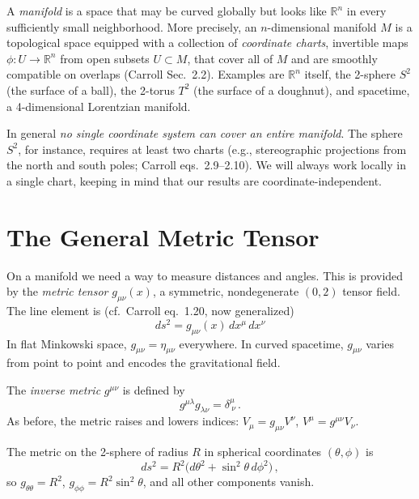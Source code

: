 A \emph{manifold} is a space that may be curved globally but looks
like $\mathbb{R}^n$ in every sufficiently small neighborhood.  More
precisely, an $n$-dimensional manifold $M$ is a topological space
equipped with a collection of \emph{coordinate charts}, invertible
maps $\phi : U \to \mathbb{R}^n$ from open subsets $U \subset M$,
that cover all of $M$ and are smoothly compatible on overlaps
(Carroll Sec.~2.2).  Examples are $\mathbb{R}^n$ itself, the 2-sphere
$S^2$ (the surface of a ball), the 2-torus $T^2$ (the surface of a
doughnut), and spacetime, a 4-dimensional Lorentzian manifold.

In general \emph{no single coordinate system can cover an
entire manifold}.  The sphere $S^2$, for instance, requires at least two
charts (e.g., stereographic projections from the north and south poles;
Carroll eqs.~2.9--2.10).  We will always work locally in a single chart,
keeping in mind that our results are coordinate-independent.


\section{The General Metric Tensor}
\label{sec:general_metric}

On a manifold we need a way to measure distances and angles.  This is
provided by the \emph{metric tensor} $g_{\mu\nu}(x)$, a symmetric,
nondegenerate $(0,2)$ tensor field.  The line element is
(cf.\ Carroll eq.~1.20, now generalized)
\begin{equation}
    \boxed{
    ds^2 = g_{\mu\nu}(x)\, dx^\mu\, dx^\nu
    }
    \label{eq:general_line_element}
\end{equation}
In flat Minkowski space, $g_{\mu\nu} = \eta_{\mu\nu}$ everywhere.  In
curved spacetime, $g_{\mu\nu}$ varies from point to point and encodes
the gravitational field.

The \emph{inverse metric} $g^{\mu\nu}$ is defined by
\begin{equation}
    g^{\mu\lambda} g_{\lambda\nu} = \delta^\mu_{\ \nu} \,.
    \label{eq:inverse_metric}
\end{equation}
As before, the metric raises and lowers indices:
$V_\mu = g_{\mu\nu} V^\nu$, $V^\mu = g^{\mu\nu} V_\nu$.

\begin{example}
The metric on the 2-sphere of radius $R$ in spherical coordinates
$(\theta, \phi)$ is
\begin{equation}
    ds^2 = R^2\bigl(d\theta^2 + \sin^2\theta\, d\phi^2\bigr) \,,
    \label{eq:sphere_metric}
\end{equation}
so $g_{\theta\theta} = R^2$, $g_{\phi\phi} = R^2\sin^2\theta$, and all
other components vanish.
\end{example}


